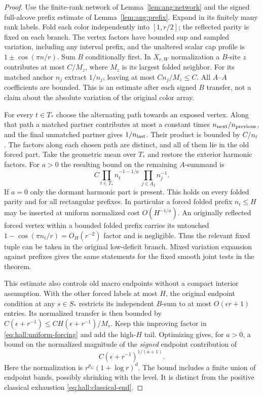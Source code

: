 \begin{proof}
Use the finite-rank network of Lemma~\ref{lem:ang:network} and the
signed full-alcove prefix estimate of Lemma~\ref{lem:ang:prefix}.
Expand in its finitely many rank labels. Fold each color independently
into \([1,r/2]\); the reflected parity is fixed on each branch.
The vertex factors have bounded sup and sampled variation, including
any interval prefix, and the unaltered scalar cap profile is
\(1\pm\cos(\pi n/r)\). Sum \(B\) conditionally first. In \(X_{r,W}\)
normalization a \(B\)-site \(z\) contributes at most \(C/M_z\), where
\(M_z\) is its largest folded neighbor. For its matched anchor
\(n_j\) extract \(1/n_j\), leaving at most \(C n_j/M_z\le C\).
All \(A\)--\(A\) coefficients are bounded. This is an estimate after
each signed \(B\) transfer, not a claim about the absolute variation
of the original color array.

For every \(t\in T_*\) choose the alternating path towards an exposed
vertex. Along that path a matched partner contributes at most a
constant times \(n_{\rm next}/n_{\rm previous}\), and the final
unmatched partner gives \(1/n_{\rm last}\). Their product is bounded
by \(C/n_t\). The factors along each chosen path are distinct, and all
of them lie in the old forced part. Take the geometric mean over
\(T_*\) and restore the exterior harmonic factors. For \(a>0\) the
resulting bound on the remaining \(A\)-summand is
\begin{equation}
 C\prod_{t\in T_*} n_t^{-1-1/a}\,
            \prod_{j\in A_I}n_j^{-1}.
 \label{eq:hall:uniform-forcing}
\end{equation}
If \(a=0\) only the dormant harmonic part is present. This holds on
every folded parity and for all rectangular prefixes. In
particular a forced folded prefix \(n_t\le H\) may be inserted at
uniform normalized cost \(O(H^{-1/a})\). An originally reflected
forced vertex within a bounded folded prefix carries its untouched
\(1-\cos(\pi n_t/r)=O_H(r^{-2})\) factor and is negligible. Thus the
relevant fixed tuple can be taken in the original low-deficit
branch. Mixed variation expansion against prefixes gives the same
statements for the fixed smooth joint tests in the theorem.

This estimate also controls old macro endpoints without a compact
interior assumption. With the other forced labels at most \(H\),
the original endpoint condition at any \(s\in S_*\) restricts its
independent \(B\)-sum to at most \(O(\epsilon r+1)\) entries. Its
normalized transfer is then bounded by
\(C(\epsilon+r^{-1})\le CH(\epsilon+r^{-1})/M_s\).
Keep this improving factor in
\eqref{eq:hall:uniform-forcing} and add the high-\(H\) tail.
Optimizing gives, for \(a>0\), a bound on the normalized magnitude of
the \emph{signed} endpoint contribution of
\begin{equation}
                       C(\epsilon+r^{-1})^{1/(a+1)} .
 \label{eq:hall:quantum-end}
\end{equation}
Here the normalization is \(r^{p_G}(1+\log r)^d\). The bound
includes a finite union of endpoint bands, possibly shrinking with
the level. It is distinct from the positive classical exhaustion
\eqref{eq:hall:classical-end}.


\end{proof}
